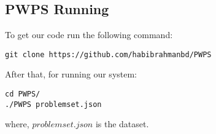 \documentclass[document.tex]{subfiles}
\begin{document}
\begin{appendices}
	\section{PWPS Running}
	To get our code run the following command:
	\begin{lstlisting}
git clone https://github.com/habibrahmanbd/PWPS
	\end{lstlisting}
	After that, for running our system:
	\begin{lstlisting}
cd PWPS/
./PWPS problemset.json
	\end{lstlisting}
	where, \textbf{$problemset.json$} is the dataset.
	\end{appendices}
\end{document}
